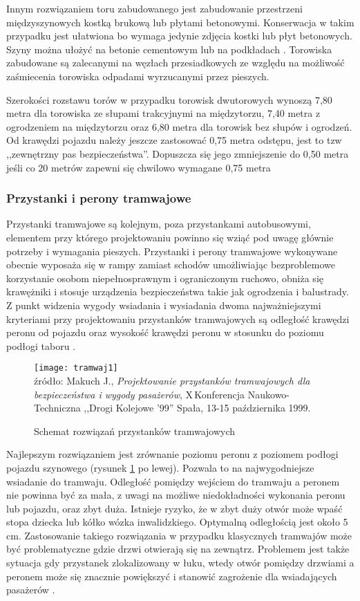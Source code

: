 \documentclass[twoside,12pt]{article}
\begin{document}
	Innym rozwiązaniem toru zabudowanego jest zabudowanie przestrzeni międzyszynowych kostką brukową lub płytami betonowymi. Konserwacja w takim przypadku jest ułatwiona bo wymaga jedynie zdjęcia kostki lub płyt betonowych. Szyny można ułożyć na betonie cementowym lub na podkładach \cite{czauderna}. Torowiska zabudowane są zalecanymi na węzłach przesiadkowych ze względu na możliwość zaśmiecenia torowiska odpadami wyrzucanymi przez pieszych.
	
	Szerokości rozstawu torów w przypadku torowisk dwutorowych wynoszą 7,80 metra dla torowiska ze słupami trakcyjnymi na międzytorzu, 7,40 metra z ogrodzeniem na międzytorzu oraz 6,80 metra dla torowisk bez słupów i ogrodzeń. Od krawędzi pojazdu należy jeszcze zastosować 0,75 metra odstępu, jest to tzw ,,zewnętrzny pas bezpieczeństwa''. Dopuszcza się jego zmniejszenie do 0,50 metra jeśli co 20 metrów zapewni się chwilowo wymagane 0,75 metra \cite{oleksiewicz}
	
	\clearpage
	\subsubsection{Przystanki i perony tramwajowe}
	Przystanki tramwajowe są kolejnym, poza przystankami autobusowymi, elementem przy którego projektowaniu powinno się wziąć pod uwagę głównie potrzeby i wymagania pieszych. Przystanki i perony tramwajowe wykonywane obecnie wyposaża się w rampy zamiast schodów umożliwiając bezproblemowe korzystanie osobom niepełnosprawnym i ograniczonym ruchowo, obniża się krawężniki i stosuje urządzenia bezpieczeństwa takie jak ogrodzenia i balustrady. Z punkt widzenia wygody wsiadania i wysiadania dwoma najważniejszymi kryteriami przy projektowaniu przystanków tramwajowych są odległość krawędzi peronu od pojazdu oraz wysokość krawędzi peronu w stosunku do poziomu podłogi taboru \cite{makuch2}. 
	
		\begin{figure}[H]
		\centering
		\caption{Schemat rozwiązań przystanków tramwajowych}
		\texttt{[image: tramwaj1]}\\
		\footnotesize{źródło: 	Makuch J., \emph{Projektowanie przystanków tramwajowych dla bezpieczeństwa i wygody pasażerów}, X\,Konferencja Naukowo-Techniczna ,,Drogi Kolejowe '99'' Spała, 13-15 października 1999. \cite{makuch2}}
		\label{tramwaj1}
	\end{figure}
	
	Najlepszym rozwiązaniem jest zrównanie poziomu peronu z poziomem podłogi pojazdu szynowego (rysunek \ref{tramwaj1} po lewej). Pozwala to na najwygodniejsze wsiadanie do tramwaju. Odległość pomiędzy wejściem do tramwaju a peronem nie powinna być za mała, z uwagi na możliwe niedokładności wykonania peronu lub pojazdu, oraz zbyt duża. Istnieje ryzyko, że w zbyt duży otwór może wpaść stopa dziecka lub kółko wózka inwalidzkiego. Optymalną odległością jest około 5 cm. Zastosowanie takiego rozwiązania w przypadku klasycznych tramwajów może być problematyczne gdzie drzwi otwierają się na zewnątrz. Problemem jest także sytuacja gdy przystanek zlokalizowany w łuku, wtedy otwór pomiędzy drzwiami a peronem może się znacznie powiększyć i stanowić zagrożenie dla wsiadających pasażerów \cite{makuch2}.
	
\end{document}
